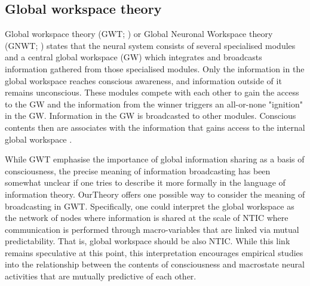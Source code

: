 \documentclass[utf8]{article}
\begin{document}
		\subsection{Global workspace theory}
		Global workspace theory (GWT; \cite{baars1988cognitive, baars1997theatre, baars2002conscious}) or Global Neuronal Workspace theory (GNWT; \cite{dehaene1998neuronal, dehaene2001towards, dehaene2011experimental}) states that the neural system consists of several specialised modules and a central global workspace (GW) which integrates and broadcasts information gathered from those specialised modules. Only the information in the global workspace reaches conscious awareness, and information outside of it remains unconscious. These modules compete with each other to gain the access to the GW and the information from the winner triggers an all-or-none "ignition" in the GW. Information in the GW is broadcasted to other modules. Conscious contents then are associates with the information that gains access to the internal global workspace \cite{Dehaene2017}.
		
        While GWT emphasise the importance of global information sharing as a basis of consciousness, the precise meaning of information broadcasting has been somewhat unclear if one tries to describe it more formally in the language of information theory. \ac{OurTheory} offers one possible way to consider the meaning of broadcasting in GWT. Specifically, one could interpret the global workspace as the network of nodes where information is shared at the scale of NTIC where communication is performed through macro-variables that are linked via mutual predictability. That is, global workspace should be also NTIC. While this link remains speculative at this point, this interpretation encourages empirical studies into the relationship between the contents of consciousness and macrostate neural activities that are mutually predictive of each other. 
		
		
		
	    
\end{document}

